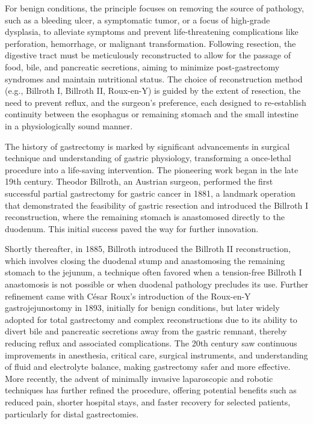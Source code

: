 For benign conditions, the principle focuses on removing the source of pathology, such as a bleeding ulcer, a symptomatic tumor, or a focus of high-grade dysplasia, to alleviate symptoms and prevent life-threatening complications like perforation, hemorrhage, or malignant transformation. Following resection, the digestive tract must be meticulously reconstructed to allow for the passage of food, bile, and pancreatic secretions, aiming to minimize post-gastrectomy syndromes and maintain nutritional status. The choice of reconstruction method (e.g., Billroth I, Billroth II, Roux-en-Y) is guided by the extent of resection, the need to prevent reflux, and the surgeon's preference, each designed to re-establish continuity between the esophagus or remaining stomach and the small intestine in a physiologically sound manner.

The history of gastrectomy is marked by significant advancements in surgical technique and understanding of gastric physiology, transforming a once-lethal procedure into a life-saving intervention. The pioneering work began in the late 19th century. Theodor Billroth, an Austrian surgeon, performed the first successful partial gastrectomy for gastric cancer in 1881, a landmark operation that demonstrated the feasibility of gastric resection and introduced the Billroth I reconstruction, where the remaining stomach is anastomosed directly to the duodenum. This initial success paved the way for further innovation.

Shortly thereafter, in 1885, Billroth introduced the Billroth II reconstruction, which involves closing the duodenal stump and anastomosing the remaining stomach to the jejunum, a technique often favored when a tension-free Billroth I anastomosis is not possible or when duodenal pathology precludes its use. Further refinement came with C\'{e}sar Roux's introduction of the Roux-en-Y gastrojejunostomy in 1893, initially for benign conditions, but later widely adopted for total gastrectomy and complex reconstructions due to its ability to divert bile and pancreatic secretions away from the gastric remnant, thereby reducing reflux and associated complications. The 20th century saw continuous improvements in anesthesia, critical care, surgical instruments, and understanding of fluid and electrolyte balance, making gastrectomy safer and more effective. More recently, the advent of minimally invasive laparoscopic and robotic techniques has further refined the procedure, offering potential benefits such as reduced pain, shorter hospital stays, and faster recovery for selected patients, particularly for distal gastrectomies.

